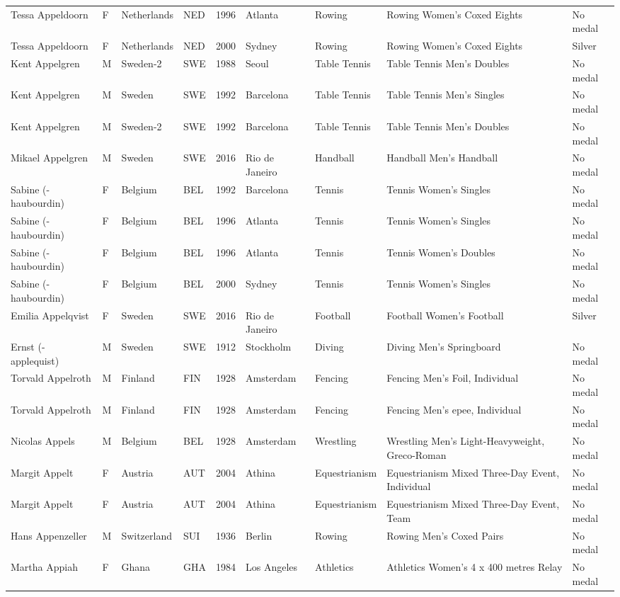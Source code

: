 \documentclass{article}%
\begin{document}
\begin{longtable}{l l l l l l l l l}
Tessa Appeldoorn&F&Netherlands&NED&1996&Atlanta&Rowing&Rowing Women's Coxed Eights&No medal\\%
Tessa Appeldoorn&F&Netherlands&NED&2000&Sydney&Rowing&Rowing Women's Coxed Eights&Silver\\%
Kent Appelgren&M&Sweden{-}2&SWE&1988&Seoul&Table Tennis&Table Tennis Men's Doubles&No medal\\%
Kent Appelgren&M&Sweden&SWE&1992&Barcelona&Table Tennis&Table Tennis Men's Singles&No medal\\%
Kent Appelgren&M&Sweden{-}2&SWE&1992&Barcelona&Table Tennis&Table Tennis Men's Doubles&No medal\\%
Mikael Appelgren&M&Sweden&SWE&2016&Rio de Janeiro&Handball&Handball Men's Handball&No medal\\%
Sabine ({-}haubourdin)&F&Belgium&BEL&1992&Barcelona&Tennis&Tennis Women's Singles&No medal\\%
Sabine ({-}haubourdin)&F&Belgium&BEL&1996&Atlanta&Tennis&Tennis Women's Singles&No medal\\%
Sabine ({-}haubourdin)&F&Belgium&BEL&1996&Atlanta&Tennis&Tennis Women's Doubles&No medal\\%
Sabine ({-}haubourdin)&F&Belgium&BEL&2000&Sydney&Tennis&Tennis Women's Singles&No medal\\%
Emilia Appelqvist&F&Sweden&SWE&2016&Rio de Janeiro&Football&Football Women's Football&Silver\\%
Ernst ({-}applequist)&M&Sweden&SWE&1912&Stockholm&Diving&Diving Men's Springboard&No medal\\%
Torvald Appelroth&M&Finland&FIN&1928&Amsterdam&Fencing&Fencing Men's Foil, Individual&No medal\\%
Torvald Appelroth&M&Finland&FIN&1928&Amsterdam&Fencing&Fencing Men's epee, Individual&No medal\\%
Nicolas Appels&M&Belgium&BEL&1928&Amsterdam&Wrestling&Wrestling Men's Light{-}Heavyweight, Greco{-}Roman&No medal\\%
Margit Appelt&F&Austria&AUT&2004&Athina&Equestrianism&Equestrianism Mixed Three{-}Day Event, Individual&No medal\\%
Margit Appelt&F&Austria&AUT&2004&Athina&Equestrianism&Equestrianism Mixed Three{-}Day Event, Team&No medal\\%
Hans Appenzeller&M&Switzerland&SUI&1936&Berlin&Rowing&Rowing Men's Coxed Pairs&No medal\\%
Martha Appiah&F&Ghana&GHA&1984&Los Angeles&Athletics&Athletics Women's 4 x 400 metres Relay&No medal\\%

\end{longtable}
\end{document}
